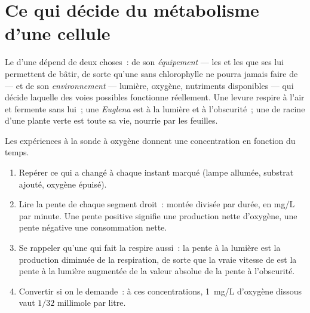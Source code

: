 \section{Ce qui décide du métabolisme d'une cellule}

\begin{proposition}\label{prop:g10:cell-metabolism:decides}
Le  d'une  dépend de deux choses~: de son
\emph{équipement} --- les  et les  que ses  lui
permettent de bâtir, de sorte qu'une  sans chlorophylle ne
pourra jamais faire de  --- et de son
\emph{environnement} --- lumière, oxygène, nutriments disponibles ---
qui décide laquelle des voies possibles fonctionne réellement. Une
levure respire à l'air et fermente sans lui~; une \emph{Euglena} est
 à la lumière et  à l'obscurité~; une  de
racine d'une plante verte est  toute sa vie, nourrie par
les feuilles.
\end{proposition}
\admitted

\begin{method}\label{met:g10:cell-metabolism:trace}
Les expériences à la sonde à oxygène donnent une concentration en
fonction du temps.
\begin{enumerate}
  \item Repérer ce qui a changé à chaque instant marqué (lampe
        allumée, substrat ajouté, oxygène épuisé).
  \item Lire la pente de chaque segment droit~: montée divisée par
        durée, en \unit{mg/L} par minute. Une pente positive signifie
        une production nette d'oxygène, une pente négative une
        consommation nette.
  \item Se rappeler qu'une  qui fait la  respire
        aussi~: la pente à la lumière est la production diminuée de la
        respiration, de sorte que la vraie vitesse de  est
        la pente à la lumière augmentée de la valeur absolue de la
        pente à l'obscurité.
  \item Convertir si on le demande~: à ces concentrations,
        \qty{1}{mg/L} d'oxygène dissous vaut $1/32$ millimole par litre.
\end{enumerate}
\end{method}

